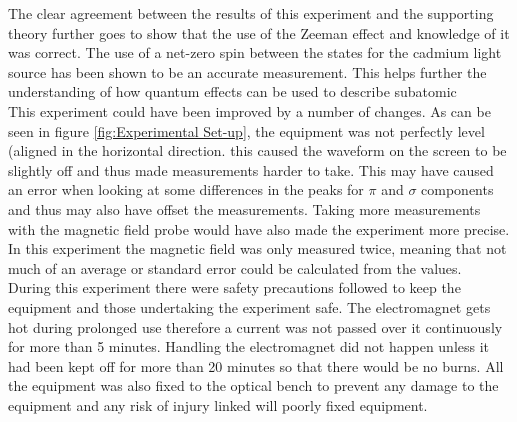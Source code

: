 \documentclass[a4paper,11pt]{article}
\begin{document}
The clear agreement between the results of this experiment and the supporting theory further goes to show that the use of the Zeeman effect and knowledge of it was correct. The use of a net-zero spin between the states for the cadmium light source has been shown to be an accurate measurement. This helps further the understanding of how quantum effects can be used to describe subatomic \\

This experiment could have been improved by a number of changes. As can be seen in figure \ref{fig:Experimental Set-up}, the equipment was not perfectly level (aligned in the horizontal direction. this caused the waveform on the screen to be slightly off and thus made measurements harder to take. This may have caused an error when looking at some differences in the peaks for $\pi$ and $\sigma$ components and thus may also have offset the measurements.
Taking more measurements with the magnetic field probe would have also made the experiment more precise. In this experiment the magnetic field was only measured twice, meaning that not much of an average or standard error could be calculated from the values.\\

During this experiment there were safety precautions followed to keep the equipment and those undertaking the experiment safe. The electromagnet gets hot during prolonged use therefore a current was not passed over it continuously for more than 5 minutes. Handling the electromagnet did not happen unless it had been kept off for more than 20 minutes so that there would be no burns. All the equipment was also fixed to the optical bench to prevent any damage to the equipment and any risk of injury linked will poorly fixed equipment.\\


\newpage
\end{document}
